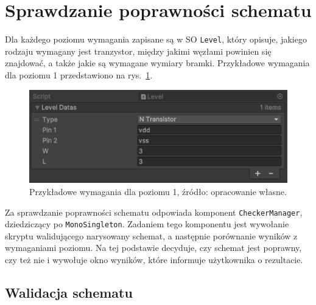 \section{Sprawdzanie poprawności schematu}
\label{sec:sprawdzanie_poprawnosci_schematu}

Dla każdego poziomu wymagania zapisane są w SO \texttt{Level}, który opisuje,
jakiego rodzaju wymagany jest tranzystor,
między jakimi węzłami powinien się znajdować,
a także jakie są wymagane wymiary bramki.
Przykładowe wymagania dla poziomu 1 przedstawiono na rys.~\ref{fig:level1_requirements}.

\begin{figure}[h]
    \centering
    \includegraphics[width=.9\textwidth]{chapters/chapter4/rys/level}
    \caption[Przykładowe wymagania dla poziomu 1.]
    {Przykładowe wymagania dla poziomu 1, źródło: opracowanie własne.}
    \label{fig:level1_requirements}
\end{figure}

Za sprawdzanie poprawności schematu odpowiada komponent \texttt{CheckerManager}, dziedziczący po \texttt{MonoSingleton}.
Zadaniem tego komponentu jest wywołanie skryptu walidującego narysowany schemat,
a następnie porównanie wyników z wymaganiami poziomu.
Na tej podstawie decyduje, czy schemat jest poprawny, czy też nie
i wywołuje okno wyników, które informuje użytkownika o rezultacie.

\subsection{Walidacja schematu}
\label{subsec:walidacja_schematu}

